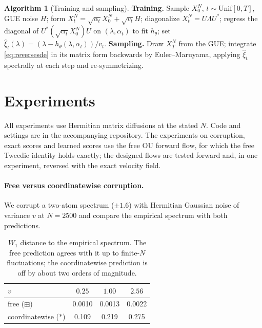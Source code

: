 \documentclass[11pt]{article}
\theoremstyle{plain}
\theoremstyle{definition}
\newtheorem{algorithmenv}[theorem]{Algorithm}
\theoremstyle{remark}
\begin{document}
\begin{algorithmenv}[Training and sampling]\label{alg:main}
\textbf{Training.} Sample $X_0^N$, $t\sim\mathrm{Unif}[0,T]$, GUE noise $H$; form
$X_t^N=\sqrt{\alpha_t}X_0^N+\sqrt{v_t}H$; diagonalize $X_t^N=U\Lambda U^*$; regress
the diagonal of $U^*(\sqrt{\alpha_t}X_0^N)U$ on $(\lambda,\alpha_t)$ to fit
$h_\theta$; set $\widehat\xi_t(\lambda)=(\lambda-h_\theta(\lambda,\alpha_t))/v_t$.
\textbf{Sampling.} Draw $X_T^N$ from the GUE; integrate \eqref{eq:reversesde} in its
matrix form backwards by Euler--Maruyama, applying $\widehat\xi_t$ spectrally at
each step and re-symmetrizing.
\end{algorithmenv}

\section{Experiments}\label{sec:experiments}

All experiments use Hermitian matrix diffusions at the stated $N$. Code and settings are in the
accompanying repository. The
experiments on corruption, exact scores and learned scores use the free OU forward flow, for which the
free Tweedie identity holds exactly; the designed flows are tested forward and, in one experiment,
reversed with the exact velocity field.

\paragraph{Free versus coordinatewise corruption.} We corrupt a two-atom spectrum ($\pm1.6$)
with Hermitian Gaussian noise of variance $v$ at $N=2500$ and compare the empirical spectrum with
both predictions.

\begin{table}[h]
\centering
\caption{$W_1$ distance to the empirical spectrum. The free prediction agrees with it up to
finite-$N$ fluctuations; the coordinatewise prediction is off by about two orders of magnitude.}
\label{tab:freevsclassical}
\begin{tabular}{lccc}
\toprule
$v$ & $0.25$ & $1.00$ & $2.56$ \\
\midrule
free ($\boxplus$) & 0.0010 & 0.0013 & 0.0022 \\
coordinatewise ($*$) & 0.109 & 0.219 & 0.275 \\
\bottomrule
\end{tabular}
\end{table}
\end{document}
